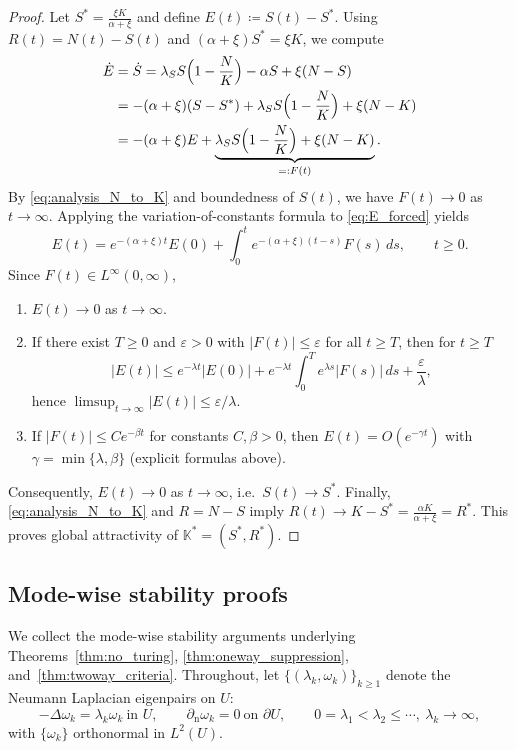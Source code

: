 \documentclass[pdflatex,sn-mathphys-ay]{sn-jnl}
\theoremstyle{thmstyleone}
\theoremstyle{definition}
\theoremstyle{remark}
\begin{document}
\begin{proof}
Let $S^*=\frac{\xi K}{\alpha+\xi}$ and define $E(t)\coloneqq S(t)-S^*$.
Using $R(t)=N(t)-S(t)$ and $(\alpha+\xi)S^*=\xi K$, we compute
\begin{align}
\dot E
&= \dot S
= \lambda_S S\Bigl(1-\frac{N}{K}\Bigr)-\alpha S+\xi(N-S)\nonumber\\
&= -(\alpha+\xi)(S-S^*) + \lambda_S S\Bigl(1-\frac{N}{K}\Bigr) + \xi(N-K)\nonumber\\
&= -(\alpha+\xi)E + \underbrace{\lambda_S S\Bigl(1-\frac{N}{K}\Bigr)+\xi(N-K)}_{=:F(t)}.
\label{eq:E_forced}
\end{align}
By \eqref{eq:analysis_N_to_K} and boundedness of $S(t)$, we have $F(t)\to0$ as $t\to\infty$.
Applying the variation-of-constants formula to \eqref{eq:E_forced} yields
\[
E(t)=e^{-(\alpha+\xi)t}E(0)+\int_0^t e^{-(\alpha+\xi)(t-s)}F(s)\,ds,\qquad t\ge 0.
\]
Since $F(t)\in L^\infty(0,\infty)$,
\begin{enumerate}[label=(\roman*)]
\item $E(t)\to0$ as $t\to\infty$.
\item If there exist $T\ge0$ and $\varepsilon>0$ with $|F(t)|\le\varepsilon$ for all $t\ge T$, then for $t\ge T$
\[
|E(t)| \le e^{-\lambda t}|E(0)| + e^{-\lambda t}\int_0^T e^{\lambda s}|F(s)|\,ds + \frac{\varepsilon}{\lambda},
\]
hence $\limsup_{t\to\infty}|E(t)|\le\varepsilon/\lambda$.
\item If $|F(t)|\le C e^{-\beta t}$ for constants $C,\beta>0$, then $E(t)=O(e^{-\gamma t})$ with $\gamma=\min\{\lambda,\beta\}$ (explicit formulas above).
\end{enumerate}
Consequently, $E(t)\to0$ as $t\to\infty$, i.e.\ $S(t)\to S^*$.
Finally, \eqref{eq:analysis_N_to_K} and $R=N-S$ imply $R(t)\to K-S^*=\frac{\alpha K}{\alpha+\xi}=R^*$.
This proves global attractivity of $\mathbb{K}^*=(S^*,R^*)$.
\end{proof}

\subsection{Mode-wise stability proofs}
\label{subsec:analysis_modewise}

We collect the mode-wise stability arguments underlying Theorems~\ref{thm:no_turing}, \ref{thm:oneway_suppression},
and~\ref{thm:twoway_criteria}. Throughout, let $\{(\lambda_k,\omega_k)\}_{k\ge1}$ denote the Neumann Laplacian eigenpairs on $U$:
\[
-\Delta \omega_k=\lambda_k\omega_k\ \text{in }U,\qquad \partial_{\mathrm n}\omega_k=0\ \text{on }\partial U,
\qquad 0=\lambda_1<\lambda_2\le\cdots,\ \lambda_k\to\infty,
\]
with $\{\omega_k\}$ orthonormal in $L^2(U)$.
\end{document}
